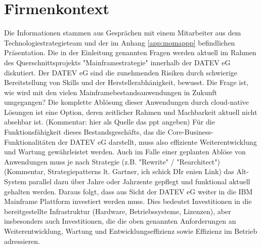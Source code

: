 \chapter{Firmenkontext}\label{ch:Firmenkontext}
Die Informationen stammen aus Gesprächen mit einem Mitarbeiter aus dem Technologiestrategieteam und der im Anhang \ref{app:momappp} befindlichen Präsentation.
Die in der Einleitung genannten Fragen werden aktuell im Rahmen des Querschnittsprojekts "Mainframestrategie" innerhalb der DATEV eG diskutiert. 
Der DATEV eG sind die zunehmenden Risiken durch schwierige Bereitstellung von Skills und der Herstellerabhänigkeit, bewusst. 
Die Frage ist, wie wird mit den vielen Mainframebestandsanwendungen in Zukunft umgegangen?
Die komplette Ablösung dieser Anwendungen durch cloud-native Lösungen ist eine Option, deren zeitlicher Rahmen und Machbarkeit aktuell nicht absehbar ist. (Kommentar: hier als Quelle das ppt angeben)
Für die Funktionsfähigkeit dieses Bestandsgeschäfts, das die Core-Business-Funktionalitäten der DATEV eG darstellt, muss also effiziente Weiterentwicklung und Wartung gewährleistet werden.
Auch im Falle einer geplanten Ablöse von Anwendungen muss je nach Strategie (z.B. "Rewrite" / "Rearchitect")(Kommentar, Strategiepatterns lt. Gartner, ich schick DIr enien Link) das Alt-System parallel dazu über Jahre oder Jahrzente gepflegt und funktional aktuell gehalten werden.
Daraus folgt, dass aus Sicht der DATEV eG weiter in die IBM Mainframe Plattform investiert werden muss. 
Dies bedeutet Investitionen in die bereitgestellte Infrastruktur (Hardware, Betriebssysteme, Lizenzen), aber insbesonders auch Investitionen, die die oben genannten Anforderungen an Weiterentwicklung, Wartung und Entwicklungseffizienz sowie Effizienz im Betrieb adressieren.

